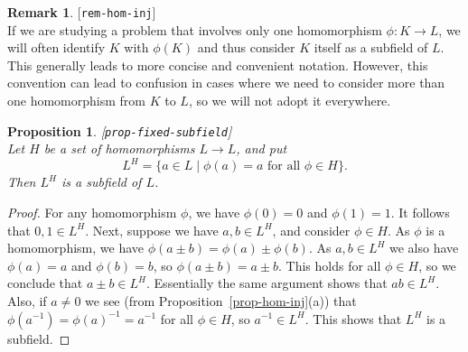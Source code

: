 \documentclass{amsart}
\newcommand{\lbl}[1]{\label{#1}\textup{[\texttt{#1}]}\ \\}
\newcommand{\lbl}{\label}
\newcommand{\st}        {\;|\;}
\renewcommand{\:}{\colon}
\newtheorem{proposition}[theorem]{Proposition}
\theoremstyle{definition}
\newtheorem{remark}[theorem]{Remark}
\begin{document}
\begin{remark}\lbl{rem-hom-inj}
 If we are studying a problem that involves only one homomorphism
 $\phi\:K\to L$, we will often identify $K$ with $\phi(K)$ and thus
 consider $K$ itself as a subfield of $L$.  This generally leads to
 more concise and convenient notation.  However, this convention can
 lead to confusion in cases where we need to consider more than one
 homomorphism from $K$ to $L$, so we will not adopt it everywhere.
\end{remark}

\begin{proposition}\lbl{prop-fixed-subfield}
 Let $H$ be a set of homomorphisms $L\to L$, and put 
 \[ L^H=\{a\in L\st \phi(a)=a \text{ for all } \phi\in H\}. \]
 Then $L^H$ is a subfield of $L$.
\end{proposition}
\begin{proof}
 For any homomorphism $\phi$, we have $\phi(0)=0$ and $\phi(1)=1$.  It
 follows that $0,1\in L^H$.  Next, suppose we have $a,b\in L^H$, and
 consider $\phi\in H$.  As $\phi$ is a homomorphism, we have
 $\phi(a\pm b)=\phi(a)\pm \phi(b)$.  As $a,b\in L^H$ we also have
 $\phi(a)=a$ and $\phi(b)=b$, so $\phi(a\pm b)=a\pm b$.  This holds
 for all $\phi\in H$, so we conclude that $a\pm b\in L^H$.
 Essentially the same argument shows that $ab\in L^H$.  Also, if
 $a\neq 0$ we see (from Proposition~\ref{prop-hom-inj}(a)) that
 $\phi(a^{-1})=\phi(a)^{-1}=a^{-1}$ for all $\phi\in H$, so
 $a^{-1}\in L^H$.  This shows that $L^H$ is a subfield.
\end{proof}
\end{document}
